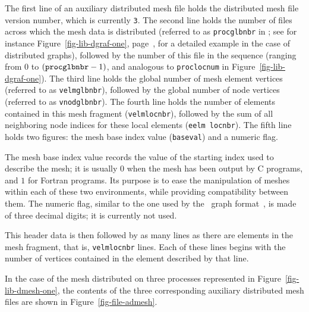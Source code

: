 The first line of an auxiliary distributed mesh file holds the
distributed mesh file version number, which is currently
\texttt{3}. The second line holds the number of files across which the
mesh data is distributed (referred to as \texttt{proc\lbo glb\lbo nbr}
in \libscotch; see for instance Figure~\ref{fig-lib-dgraf-one},
page~\pageref{fig-lib-dgraf-one}, for a detailed example in the case
of distributed graphs), followed by the number of this file in the
sequence (ranging from $0$ to $(\texttt{proc\lbo glb\lbo nbr} - 1)$,
and analogous to \texttt{proc\lbo loc\lbo num} in
Figure~\ref{fig-lib-dgraf-one}). The third line holds the global
number of mesh element vertices (referred to as
\texttt{velm\lbo glb\lbo nbr}), followed by the global number of node
vertices (referred to as \texttt{vnod\lbo glb\lbo nbr}). The fourth
line holds the number of elements contained in this mesh fragment
(\texttt{velm\lbo loc\lbo nbr}), followed by the sum of all
neighboring node indices for these local elements (\texttt{eelm\lbo
  loc\lbo nbr}). The fifth line holds two figures: the mesh base index
value (\texttt{baseval}) and a numeric flag.

The mesh base index value records the value of the starting index
used to describe the mesh; it is usually $0$ when the mesh has been
output by C programs, and $1$ for Fortran programs. Its purpose is to
ease the manipulation of meshes within each of these two environments,
while providing compatibility between them.
The numeric flag, similar to the one used by the \chaco\ graph
format~\cite{hele93c}, is made of three decimal digits; it is
currently not used.

This header data is then followed by as many lines as there are
elements in the mesh fragment, that is, \texttt{velm\lbo loc\lbo nbr}
lines. Each of these lines begins with the number of vertices
contained in the element described by that line.

In the case of the mesh distributed on three processes represented in
Figure~\ref{fig-lib-dmesh-one}, the contents of the three corresponding
auxiliary distributed mesh files are shown in
Figure~\ref{fig-file-admesh}.

